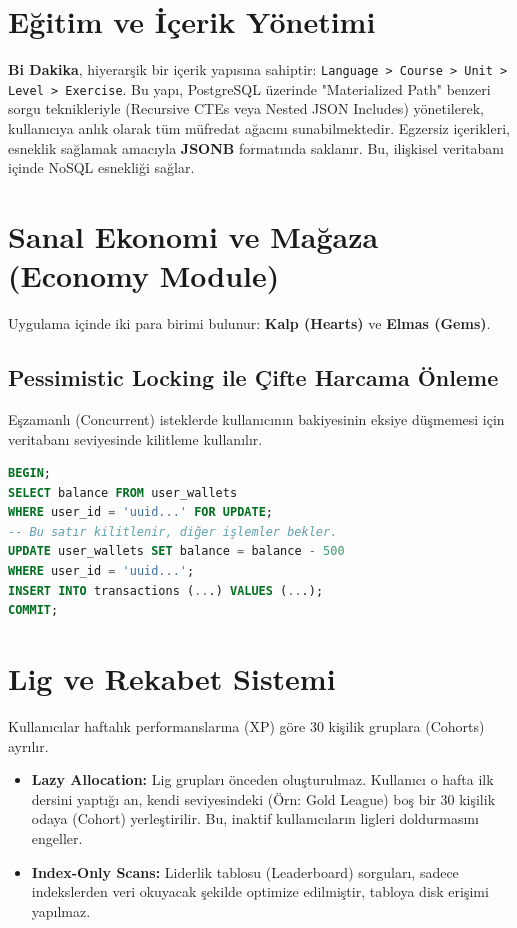 \documentclass[12pt,a4paper]{report}
\begin{document}
\section{Eğitim ve İçerik Yönetimi}
\textbf{Bi Dakika}, hiyerarşik bir içerik yapısına sahiptir: \texttt{Language > Course > Unit > Level > Exercise}.
Bu yapı, PostgreSQL üzerinde "Materialized Path" benzeri sorgu teknikleriyle (Recursive CTEs veya Nested JSON Includes) yönetilerek, kullanıcıya anlık olarak tüm müfredat ağacını sunabilmektedir. Egzersiz içerikleri, esneklik sağlamak amacıyla \textbf{JSONB} formatında saklanır. Bu, ilişkisel veritabanı içinde NoSQL esnekliği sağlar.

\section{Sanal Ekonomi ve Mağaza (Economy Module)}
Uygulama içinde iki para birimi bulunur: \textbf{Kalp (Hearts)} ve \textbf{Elmas (Gems)}.
\subsection{Pessimistic Locking ile Çifte Harcama Önleme}
Eşzamanlı (Concurrent) isteklerde kullanıcının bakiyesinin eksiye düşmemesi için veritabanı seviyesinde kilitleme kullanılır.
\begin{lstlisting}[language=SQL, caption=Pessimistic Locking Örneği]
BEGIN;
SELECT balance FROM user_wallets 
WHERE user_id = 'uuid...' FOR UPDATE; 
-- Bu satır kilitlenir, diğer işlemler bekler.
UPDATE user_wallets SET balance = balance - 500 
WHERE user_id = 'uuid...';
INSERT INTO transactions (...) VALUES (...);
COMMIT;
\end{lstlisting}

\section{Lig ve Rekabet Sistemi}
Kullanıcılar haftalık performanslarına (XP) göre 30 kişilik gruplara (Cohorts) ayrılır.
\begin{itemize}
    \item \textbf{Lazy Allocation:} Lig grupları önceden oluşturulmaz. Kullanıcı o hafta ilk dersini yaptığı an, kendi seviyesindeki (Örn: Gold League) boş bir 30 kişilik odaya (Cohort) yerleştirilir. Bu, inaktif kullanıcıların ligleri doldurmasını engeller.
    \item \textbf{Index-Only Scans:} Liderlik tablosu (Leaderboard) sorguları, sadece indekslerden veri okuyacak şekilde optimize edilmiştir, tabloya disk erişimi yapılmaz.
\end{itemize}
\end{document}
